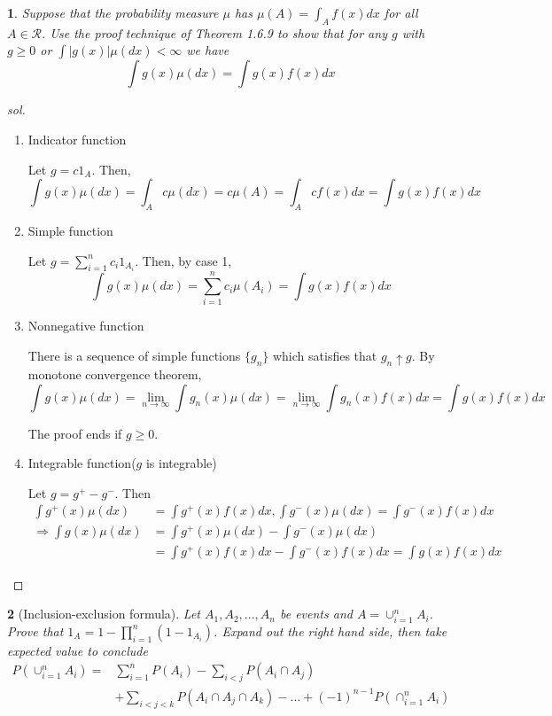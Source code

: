 \documentclass{report}
\newtheorem{ex}{}[section]
\begin{document}
\begin{ex}
Suppose that the probability measure $\mu$ has $\mu(A) = \int_A f(x)dx$ for all $A \in \mathcal{R}$. Use the proof technique of Theorem 1.6.9 to show that for any $g$ with $g \ge 0$ or $\int |g(x)|\mu(dx) < \infty$ we have
\[\int g(x)\mu(dx) = \int g(x)f(x)dx\]
\end{ex}
\begin{proof}[sol]~
\begin{enumerate}
    \item Indicator function
    
    Let $g = c1_{A}$. Then,
    \[\int g(x)\mu(dx) = \int_A c\mu(dx) = c\mu(A) = \int_A cf(x)dx = \int g(x)f(x)dx\]
    \item Simple function
    
    Let $g = \sum_{i=1}^n c_i1_{A_i}$. Then, by case 1,
    \[\int g(x)\mu(dx) = \sum_{i=1}^n  c_i\mu(A_i) = \int g(x)f(x)dx\]
    \item Nonnegative function
    
    There is a sequence of simple functions $\{g_n\}$ which satisfies that $g_n \uparrow g$. By monotone convergence theorem,
    \[\int g(x)\mu(dx) = \lim_{n\to\infty} \int g_n(x)\mu(dx) = \lim_{n\to\infty} \int g_n(x)f(x)dx = \int g(x)f(x)dx\]
    
    The proof ends if $g \ge 0$.
    \item Integrable function($g$ is integrable)
    
    Let $g = g^+ - g^-$. Then
    \begin{align*}
        \int g^+(x)\mu(dx) &= \int g^+(x)f(x)dx, \int g^-(x)\mu(dx) = \int g^-(x)f(x)dx\\
        \Rightarrow \int g(x)\mu(dx) &=  \int g^+(x)\mu(dx) - \int g^-(x)\mu(dx)\\
        &=  \int g^+(x)f(x)dx - \int g^-(x)f(x)dx = \int g(x)f(x)dx
    \end{align*}
    
    
\end{enumerate}
\end{proof}
\begin{ex}[Inclusion-exclusion formula]
Let $A_1,A_2,...,A_n$ be events and $A = \cup_{i=1}^n A_i$. Prove that $1_A = 1 - \prod_{i=1}^n (1 - 1_{A_i})$. Expand out the right hand side, then take expected value to conclude
\begin{align*}
    P(\cup_{i=1}^n A_i) = &\sum_{i=1}^n P(A_i) - \sum_{i < j}P(A_i \cap A_j)\\
    &+ \sum_{i < j < k} P(A_i \cap A_j \cap A_k) - ... + (-1)^{n-1}P(\cap_{i=1}^n A_i)
\end{align*}
\end{ex}
\end{document}
